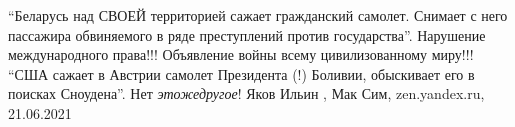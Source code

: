 \enquote{Беларусь над СВОЕЙ территорией сажает гражданский самолет. Снимает с него
пассажира обвиняемого в ряде преступлений против государства}. Нарушение
международного права!!! Объявление войны всему цивилизованному миру!!!
\enquote{США сажает в Австрии самолет Президента (!) Боливии, обыскивает его в поисках
Сноудена}. Нет \emph{этожедругое}!
Яков Ильин
 , 
 Мак Сим, zen.yandex.ru, 21.06.2021

